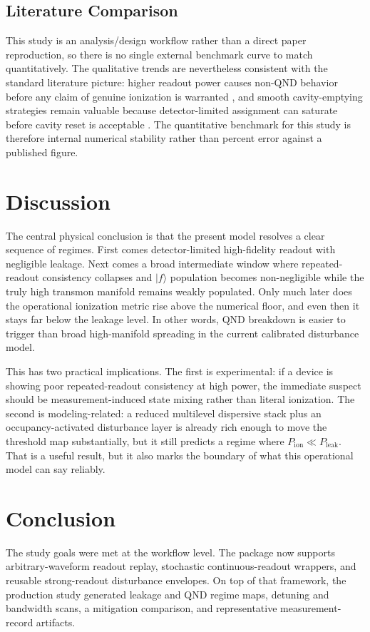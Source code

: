 \documentclass[11pt, a4paper]{article}
\begin{document}
\subsection{Literature Comparison}
This study is an analysis/design workflow rather than a direct paper reproduction, so there is no single external benchmark curve to match quantitatively. The qualitative trends are nevertheless consistent with the standard literature picture: higher readout power causes non-QND behavior before any claim of genuine ionization is warranted \cite{sank2016measurement}, and smooth cavity-emptying strategies remain valuable because detector-limited assignment can saturate before cavity reset is acceptable \cite{jeffrey2014fast,mcclure2016rapid,walter2017rapid}. The quantitative benchmark for this study is therefore internal numerical stability rather than percent error against a published figure.

\section{Discussion}
The central physical conclusion is that the present model resolves a clear sequence of regimes. First comes detector-limited high-fidelity readout with negligible leakage. Next comes a broad intermediate window where repeated-readout consistency collapses and
$|f\rangle$
population becomes non-negligible while the truly high transmon manifold remains weakly populated. Only much later does the operational ionization metric rise above the numerical floor, and even then it stays far below the leakage level. In other words, QND breakdown is easier to trigger than broad high-manifold spreading in the current calibrated disturbance model.

This has two practical implications. The first is experimental: if a device is showing poor repeated-readout consistency at high power, the immediate suspect should be measurement-induced state mixing rather than literal ionization. The second is modeling-related: a reduced multilevel dispersive stack plus an occupancy-activated disturbance layer is already rich enough to move the threshold map substantially, but it still predicts a regime where
$P_{\mathrm{ion}} \ll P_{\mathrm{leak}}$.
That is a useful result, but it also marks the boundary of what this operational model can say reliably.

\section{Conclusion}
The study goals were met at the workflow level. The package now supports arbitrary-waveform readout replay, stochastic continuous-readout wrappers, and reusable strong-readout disturbance envelopes. On top of that framework, the production study generated leakage and QND regime maps, detuning and bandwidth scans, a mitigation comparison, and representative measurement-record artifacts.
\end{document}
